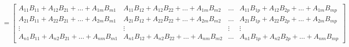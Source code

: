 \documentclass{report}
\begin{document}
\begin{equation}
=\begin{bmatrix} A_{ 11 }B_{ 11 } + A_{ 12 }B_{ 21 } + \ldots + A_{ 1m }B_{ m1 } & A_{ 11 }B_{ 12 } + A_{ 12 }B_{ 22 } + \ldots + A_{ 1m }B_{ m2 } & \ldots & A_{ 11 }B_{ 1p } + A_{ 12 }B_{ 2p } + \ldots + A_{ 1m }B_{ mp } \\ A_{ 21 }B_{ 11 } + A_{ 22 }B_{ 21 } + \ldots + A_{ 2m }B_{ m1 } & A_{ 21 }B_{ 12 } + A_{ 22 }B_{ 22 } + \ldots + A_{ 2m }B_{ m2 } & \ldots & A_{ 21 }B_{ 1p } + A_{ 22 }B_{ 2p } + \ldots + A_{ 2m }B_{ mp } \\ \vdots & \vdots & \vdots & \vdots \\ A_{ n1 }B_{ 11 } + A_{ n2 }B_{ 21 } + \ldots + A_{ nm} B_{ m1} & A_{ n1} B_{ 12} + A_{ n2} B_{ 22} + \ldots + A_{ nm} B_{ m2} & \ldots & A_{ n1} B_{ 1p} + A_{ n2} B_{ 2p} + \ldots + A_{ nm} B _{ mp }\end{bmatrix}
\end{equation}
\end{document}
